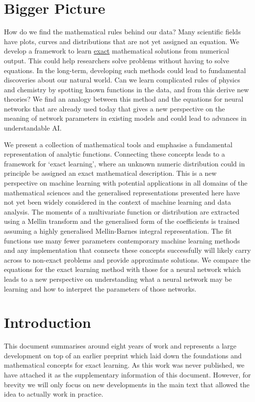 \documentclass{article}
\begin{document}
\section{Bigger Picture}
How do we find the mathematical rules behind our data? Many scientific fields have plots, curves and distributions that are not yet assigned an equation. We develop a framework to learn \underline{exact} mathematical solutions from numerical output. This could help researchers solve problems without having to solve equations.
In the long-term, developing such methods could lead to fundamental discoveries about our natural world. Can we learn complicated rules of physics and chemistry by spotting known functions in the data, and from this derive new theories?
We find an analogy between this method and the equations for neural networks that are already used today that gives a new perspective on the meaning of network parameters in existing models and could lead to advances in understandable AI. 





We present a collection of mathematical tools and emphasise a fundamental representation of analytic functions. Connecting these concepts leads to a framework for `exact learning', where an unknown numeric distribution could in principle be assigned an exact mathematical description. This is a new perspective on machine learning with potential applications in all domains of the mathematical sciences and the generalised representations presented here have not yet been widely considered in the context of machine learning and data analysis. The moments of a multivariate function or distribution are extracted using a Mellin transform and the generalised form of the coefficients is trained assuming a highly generalised Mellin-Barnes integral representation. The fit functions use many fewer parameters contemporary machine learning methods and any implementation that connects these concepts successfully will likely carry across to non-exact problems and provide approximate solutions. We compare the equations for the exact learning method with those for a neural network which leads to a new perspective on understanding what a neural network may be learning and how to interpret the parameters of those networks.


\section{Introduction}
This document summarises around eight years of work and represents a large development on top of an earlier preprint which laid down the foundations and mathematical concepts for exact learning. As this work was never published, we have attached it as the supplementary information of this document. However, for brevity we will only focus on new developments in the main text that allowed the idea to actually work in practice. 
\end{document}
